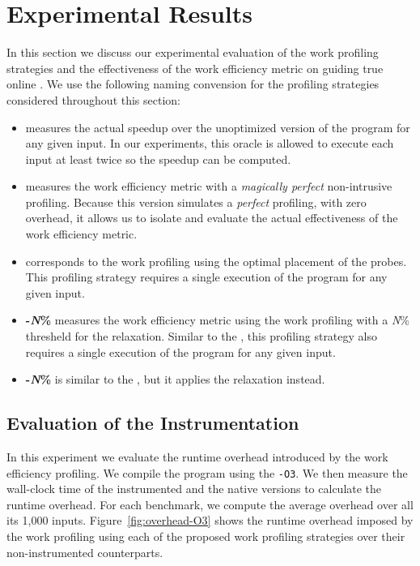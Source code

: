 \section{Experimental Results}\label{sec:results}


In this section we discuss our experimental evaluation of the work profiling strategies and
the effectiveness of the work efficiency metric on guiding true online {\itercomp}.
We use the following naming convension for the profiling strategies considered
throughout this section:
\begin{itemize}[leftmargin=3mm]
\item \textbf{\OracleRM} measures the actual speedup over the unoptimized version of the program for any given input.
In our experiments, this oracle is allowed to execute each input at least twice so the speedup can be computed.
\item \textbf{\OraclePP} measures the work efficiency metric with a \textit{magically perfect} non-intrusive profiling.
  Because this version simulates a \textit{perfect} profiling, with zero overhead,
  it allows us to isolate and evaluate the actual effectiveness of the work efficiency metric.
\item \textbf{\OptProf} corresponds to the work profiling using the optimal placement of the probes.
  This profiling strategy requires a single execution of the program for any given input.
\item \textbf{\WCRelax-\textit{N}\%} measures the work efficiency metric using the work profiling with a \textit{N}\% thresheld for
the \WCRelaxLower relaxation.
  Similar to the \OptProf, this profiling strategy also requires a single execution of the program for any given input.
\item \textbf{\WPRelax-\textit{N}\%} is similar to the \WCRelax, but it applies the \WPRelaxLower relaxation instead.
\end{itemize}

\subsection{Evaluation of the Instrumentation}

In this experiment we evaluate the runtime overhead introduced by the work efficiency profiling. We compile the program using the
\texttt{-O3}. We then measure the wall-clock time of the instrumented and the native versions to calculate the runtime overhead. For
each benchmark, we compute the average overhead over all its 1,000 inputs.
Figure~\ref{fig:overhead-O3} shows the runtime overhead imposed by the work profiling using each of the proposed work profiling strategies over
their non-instrumented counterparts.

